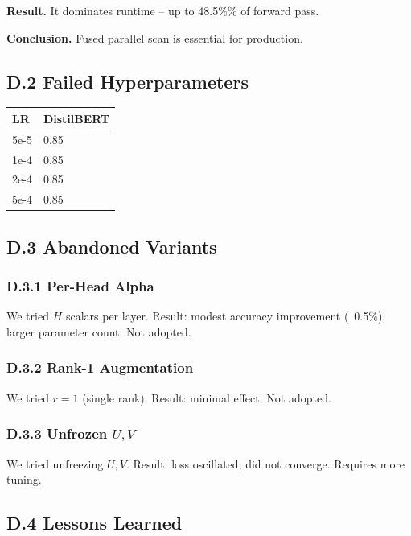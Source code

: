 \textbf{Result.} It dominates runtime -- up to 48.5\%\% of forward pass.

\textbf{Conclusion.} Fused parallel scan is essential for production.

\subsection{D.2 Failed Hyperparameters}

\begin{table}[H]
\centering
\small
\begin{tabular}{ll}
\toprule
\textbf{LR} & \textbf{DistilBERT} \\
\midrule
5e-5 & 0.85 \\
1e-4 & 0.85 \\
2e-4 & 0.85 \\
5e-4 & 0.85 \\
\bottomrule
\end{tabular}
\end{table}

\subsection{D.3 Abandoned Variants}

\subsubsection{D.3.1 Per-Head Alpha}

We tried $H$ scalars per layer. Result: modest accuracy improvement (~0.5\%), 
larger parameter count. Not adopted.

\subsubsection{D.3.2 Rank-1 Augmentation}

We tried $r = 1$ (single rank). Result: minimal effect. Not adopted.

\subsubsection{D.3.3 Unfrozen $U, V$}

We tried unfreezing $U, V$. Result: loss oscillated, did not converge. 
Requires more tuning.

\subsection{D.4 Lessons Learned}

